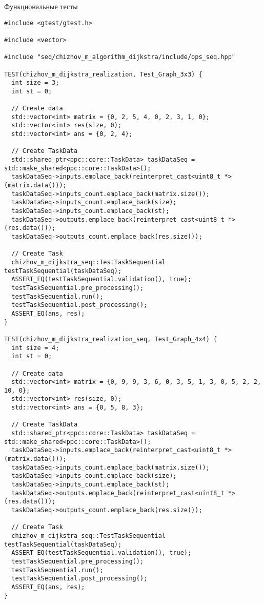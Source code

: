 \documentclass[a4paper, 14pt]{extarticle}
\begin{document}
Функциональные тесты\\

\begin{lstlisting}
#include <gtest/gtest.h>

#include <vector>

#include "seq/chizhov_m_algorithm_dijkstra/include/ops_seq.hpp"

TEST(chizhov_m_dijkstra_realization, Test_Graph_3x3) {
  int size = 3;
  int st = 0;

  // Create data
  std::vector<int> matrix = {0, 2, 5, 4, 0, 2, 3, 1, 0};
  std::vector<int> res(size, 0);
  std::vector<int> ans = {0, 2, 4};

  // Create TaskData
  std::shared_ptr<ppc::core::TaskData> taskDataSeq = std::make_shared<ppc::core::TaskData>();
  taskDataSeq->inputs.emplace_back(reinterpret_cast<uint8_t *>(matrix.data()));
  taskDataSeq->inputs_count.emplace_back(matrix.size());
  taskDataSeq->inputs_count.emplace_back(size);
  taskDataSeq->inputs_count.emplace_back(st);
  taskDataSeq->outputs.emplace_back(reinterpret_cast<uint8_t *>(res.data()));
  taskDataSeq->outputs_count.emplace_back(res.size());

  // Create Task
  chizhov_m_dijkstra_seq::TestTaskSequential testTaskSequential(taskDataSeq);
  ASSERT_EQ(testTaskSequential.validation(), true);
  testTaskSequential.pre_processing();
  testTaskSequential.run();
  testTaskSequential.post_processing();
  ASSERT_EQ(ans, res);
}

TEST(chizhov_m_dijkstra_realization_seq, Test_Graph_4x4) {
  int size = 4;
  int st = 0;

  // Create data
  std::vector<int> matrix = {0, 9, 9, 3, 6, 0, 3, 5, 1, 3, 0, 5, 2, 2, 10, 0};
  std::vector<int> res(size, 0);
  std::vector<int> ans = {0, 5, 8, 3};

  // Create TaskData
  std::shared_ptr<ppc::core::TaskData> taskDataSeq = std::make_shared<ppc::core::TaskData>();
  taskDataSeq->inputs.emplace_back(reinterpret_cast<uint8_t *>(matrix.data()));
  taskDataSeq->inputs_count.emplace_back(matrix.size());
  taskDataSeq->inputs_count.emplace_back(size);
  taskDataSeq->inputs_count.emplace_back(st);
  taskDataSeq->outputs.emplace_back(reinterpret_cast<uint8_t *>(res.data()));
  taskDataSeq->outputs_count.emplace_back(res.size());

  // Create Task
  chizhov_m_dijkstra_seq::TestTaskSequential testTaskSequential(taskDataSeq);
  ASSERT_EQ(testTaskSequential.validation(), true);
  testTaskSequential.pre_processing();
  testTaskSequential.run();
  testTaskSequential.post_processing();
  ASSERT_EQ(ans, res);
}


\end{lstlisting}
\end{document}
